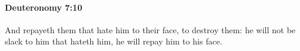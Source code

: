 
		\paragraph{Deuteronomy 7:10} %
			\label{DEUTERONOMY-7-10}

			And repayeth them that hate him to their face, to destroy them: he will not be slack to him that hateth him, he will repay him to his face.


